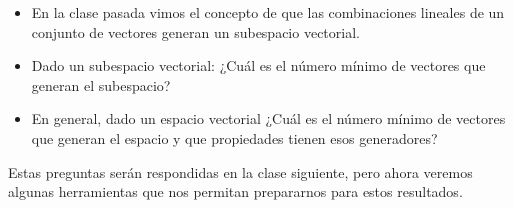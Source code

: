 \documentclass[handout]{beamer} %
\newcommand{\K}{\mathbb K}
\begin{document}
    
    


    \begin{frame}
        \begin{itemize}
            \item En  la clase pasada vimos el concepto de que las combinaciones lineales de un conjunto de vectores generan un subespacio vectorial.\pause
            \item Dado un subespacio vectorial: ¿Cuál es el  número mínimo de vectores que generan el subespacio?
            \item En  general, dado un espacio vectorial ¿Cuál es el  número mínimo de vectores que generan el espacio y que propiedades tienen esos generadores?\pause
   
        \end{itemize}
   \vskip 1cm\pause
        Estas preguntas serán respondidas en la clase siguiente,  pero ahora veremos algunas herramientas que nos permitan prepararnos para estos resultados.   
       \end{frame}  
       
\end{document}
